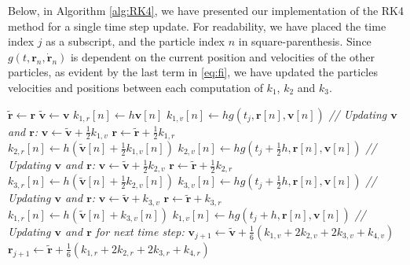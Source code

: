 \documentclass[english,notitlepage,reprint]{revtex4-2}  %
\newcommand{\AlgComment}[1]{\Statex \textcolor{codegreen}{\textit{// #1}}}
\renewcommand{\vec}[1]{\mathbf{#1}}
\begin{document}
Below, in Algorithm \ref{alg:RK4}, we have presented our implementation of the RK4 method for a single time step update. For readability, we have placed the time index \(j\) as a subscript, and the particle index \(n\) in square-parenthesis. Since \(g(t,\vec{r}_n, \dot{\vec{r}}_n)\) is dependent on the current position and velocities of the other particles, as evident by the last term in \eqref{eq:fi}, we have updated the particles velocities and positions between each computation of \(k_1\), \(k_2\) and \(k_3\).
\begin{algorithm}[H] 
\caption{RK4: Next time step}
\begin{algorithmic}[1]
\State \(\tilde{\vec{r}} \gets \vec{r}\)    
\State \(\tilde{\vec{v}} \gets \vec{v}\)    
 
  \State \(k_{1,r}[n] \gets h\vec{v}[n]\) 
  \State \(k_{1,v}[n] \gets hg(t_j, \vec{r}[n], \vec{v}[n])\)
\EndFor
\AlgComment{Updating \(\vec{v}\) and \(\vec{r}\):}
\State \(\vec{v} \gets \tilde{\vec{v}} + \frac{1}{2}k_{1,v}\)
\State \(\vec{r} \gets \tilde{\vec{r}} + \frac{1}{2}k_{1,r}\)
\\ 
 
  \State \(k_{2,r}[n] \gets h\left(\tilde{\vec{v}}[n] + \frac{1}{2}k_{1,v}[n]\right)\) 
  \State \(k_{2,v}[n] \gets hg(t_j + \frac{1}{2}h, \vec{r}[n], \vec{v}[n])\)
\EndFor
\AlgComment{Updating \(\vec{v}\) and \(\vec{r}\):}
\State \(\vec{v} \gets \tilde{\vec{v}} + \frac{1}{2}k_{2,v}\)
\State \(\vec{r} \gets \tilde{\vec{r}} + \frac{1}{2}k_{2,r}\)
\\ 
 
  \State \(k_{3,r}[n] \gets h\left(\tilde{\vec{v}}[n] + \frac{1}{2}k_{2,v}[n]\right)\) 
  \State \(k_{3,v}[n] \gets hg(t_j+\frac{1}{2}h, \vec{r}[n], \vec{v}[n])\)
\EndFor
\AlgComment{Updating \(\vec{v}\) and \(\vec{r}\):}
\State \(\vec{v} \gets \tilde{\vec{v}} + k_{3,v}\)
\State \(\vec{r} \gets \tilde{\vec{r}} + k_{3,r}\)
\\ 
 
  \State \(k_{1,r}[n] \gets h\left(\tilde{\vec{v}}[n] + k_{3,v}[n]\right)\) 
  \State \(k_{1,v}[n] \gets hg(t_j+h, \vec{r}[n], \vec{v}[n])\)
\EndFor
\AlgComment{Updating \(\vec{v}\) and \(\vec{r}\) for next time step:}
\State \(\vec{v}_{j+1} \gets \tilde{\vec{v}} +\frac{1}{6}\left(k_{1,v} + 2k_{2,v} + 2k_{3,v} + k_{4,v}\right)\)
\State \(\vec{r}_{j+1} \gets \tilde{\vec{r}} +\frac{1}{6}\left(k_{1,r} + 2k_{2,r} + 2k_{3,r} + k_{4,r}\right)\)
\end{algorithmic}
\label{alg:RK4}
\end{algorithm}
\end{document}
